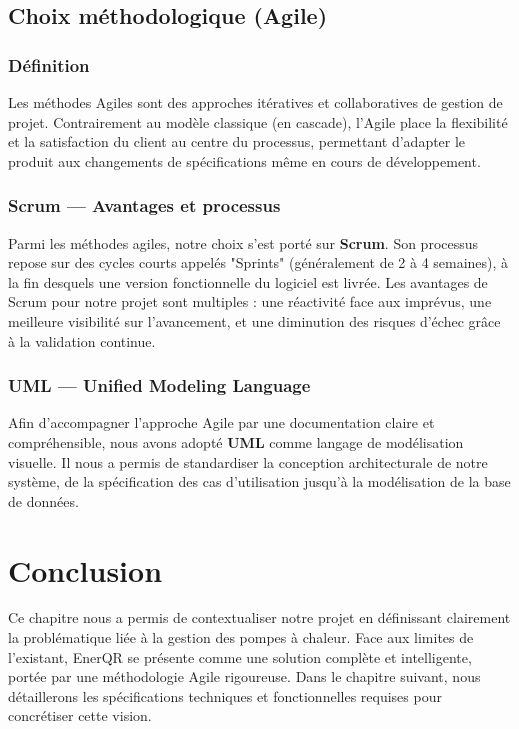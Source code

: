\documentclass[12pt,a4paper]{report}
\begin{document}
\subsection{Choix méthodologique (Agile)}
\subsubsection{Définition}
Les méthodes Agiles sont des approches itératives et collaboratives de gestion de projet. Contrairement au modèle classique (en cascade), l'Agile place la flexibilité et la satisfaction du client au centre du processus, permettant d'adapter le produit aux changements de spécifications même en cours de développement.

\subsubsection{Scrum — Avantages et processus}
Parmi les méthodes agiles, notre choix s'est porté sur \textbf{Scrum}. Son processus repose sur des cycles courts appelés "Sprints" (généralement de 2 à 4 semaines), à la fin desquels une version fonctionnelle du logiciel est livrée.
Les avantages de Scrum pour notre projet sont multiples : une réactivité face aux imprévus, une meilleure visibilité sur l'avancement, et une diminution des risques d'échec grâce à la validation continue.

\subsubsection{UML — Unified Modeling Language}
Afin d'accompagner l'approche Agile par une documentation claire et compréhensible, nous avons adopté \textbf{UML} comme langage de modélisation visuelle. Il nous a permis de standardiser la conception architecturale de notre système, de la spécification des cas d'utilisation jusqu'à la modélisation de la base de données.

\section*{Conclusion}
Ce chapitre nous a permis de contextualiser notre projet en définissant clairement la problématique liée à la gestion des pompes à chaleur. Face aux limites de l'existant, EnerQR se présente comme une solution complète et intelligente, portée par une méthodologie Agile rigoureuse. Dans le chapitre suivant, nous détaillerons les spécifications techniques et fonctionnelles requises pour concrétiser cette vision.
\end{document}
